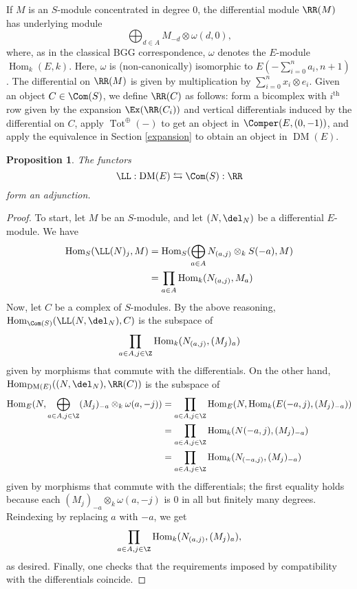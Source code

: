 \documentclass[12pt]{amsart}
\newtheorem{prop}[lemma]{Proposition}
\theoremstyle{definition}
\theoremstyle{remark}
\newcommand{\Hom}{\operatorname{Hom}} %
\def\on{\operatorname}
\def\DM{\operatorname{DM}}
\def\th{\on{th}}
\def\o{\omega}
\begin{document}
If $M$ is an $S$-module concentrated in degree 0, the differential module $\RR(M)$ has underlying module
$$
\bigoplus_{d \in A} M_{-d} \otimes \o(d, 0),
$$
where, as in the classical BGG correspondence, $\o$ denotes the $E$-module $\Hom_k(E, k)$. Here, $\o$ is (non-canonically) isomorphic to $E(-\sum_{i = 0}^n a_i, n+1)$. The differential on $\RR(M)$ is given by multiplication by $\sum_{i = 0}^n x_i \otimes e_i$.
Given an object $C \in \Com(S)$, we define $\RR(C)$ as follows: form a bicomplex with $i^{\th}$ row given by the expansion $\Ex(\RR(C_i))$ and vertical differentials induced by the differential on $C$, apply $\on{Tot}^{\oplus}( - )$ to get an object in $\Comper(E, (0,-1))$, and apply the equivalence in Section \ref{expansion} to obtain an object in $\DM(E)$.

\iffalse
\begin{equation}
\label{bicomplex}
\xymatrix{ 
& \ar[d]^-{\del}   & \ar[d]^-{\del}   & \\
\cdots & \RR(C_q)_p\ar[l]  \ar[d]^-{ \del}     & \RR(C_{q})_{p+1}   \ar[d]^-{ \del}  \ar[l]& \cdots \ar[l]\\
\cdots & \RR(C_{q - 1})_p\ar[d]^-{\del} \ar[l] &  \RR(C_{q -1})_{p+1} \ar[d]^-{\del}  \ar[l]& \ar[l]\cdots \\
&&&
}
\end{equation}
\fi


\begin{prop}
The functors
$$
\LL :  \DM(E) \leftrightarrows \Com(S) : \RR
$$
form an adjunction.
\end{prop}

\begin{proof}
To start, let $M$ be an $S$-module, and let $(N, \del_N)$ be a differential $E$-module. We have
\begin{align*}
\Hom_S( \LL(N)_j, M) &= \Hom_S(\bigoplus_{a \in A} N_{(a, j)} \otimes_k S(-a), M) \\
&=  \prod_{a \in A} \Hom_k ( N_{(a, j)} , M_a)\\
\end{align*}
Now, let $C$ be a complex of $S$-modules. By the above reasoning, $\Hom_{\Com(S)}( \LL(N, \del_N), C)$ is the subspace of 
$$
\prod_{a \in A, j \in \Z} \Hom_k ( N_{(a, j)} , (M_j)_{a})
$$
given by morphisms that commute with the differentials. On the other hand, $\Hom_{\DM(E)}((N, \del_N), \RR(C))$ is the subspace of 
\begin{align*}
\Hom_E(N, \bigoplus_{a \in A, j \in \Z} (M_j)_{-a} \otimes_k \o(a, -j)) &= \prod_{a \in A, j \in \Z}\Hom_E(N,  \Hom_k(E(-a, j), (M_j)_{-a}  ))  \\
&=   \prod_{a \in A, j \in \Z} \Hom_k(N(-a, j),  (M_j)_{-a} ) \\
&=  \prod_{a \in A, j \in \Z} \Hom_k(N_{(-a, j)},   (M_j)_{-a} )
\end{align*}
given by morphisms that commute with the differentials; the first equality holds because each $(M_j)_{-a} \otimes_k \o(a, -j)$ is 0 in all but finitely many degrees. Reindexing by replacing $a$ with $-a$, we get
$$
\prod_{a \in A, j \in \Z} \Hom_k(N_{(a, j)},   (M_j)_{a} ),
$$
as desired. Finally, one checks that the requirements imposed by compatibility with the differentials coincide.\end{proof}
\end{document}
